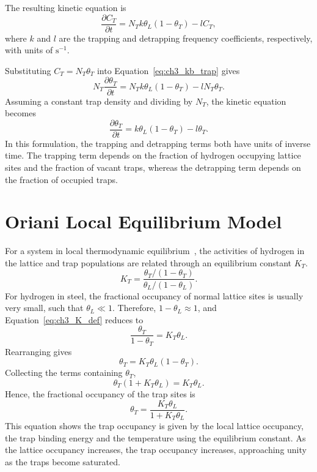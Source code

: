 \documentclass[a4paper,12pt,oneside]{report}
\begin{document}
The resulting kinetic equation is
\begin{equation}
\frac{\partial C_T}{\partial t} = N_T k\theta_L(1-\theta_T)-lC_T,
\label{eq:ch3_kb_trap}
\end{equation}
where $k$ and $l$ are the trapping and detrapping frequency coefficients, respectively, with units of $\mathrm{s}^{-1}$.

Substituting $C_T=N_T\theta_T$ into Equation~\eqref{eq:ch3_kb_trap} gives
\begin{equation}
N_T\frac{\partial\theta_T}{\partial t} = N_Tk\theta_L(1-\theta_T)-lN_T\theta_T.
\label{eq:ch3_kb_sub}
\end{equation}
Assuming a constant trap density and dividing by $N_T$, the kinetic equation becomes
\begin{equation}
\frac{\partial\theta_T}{\partial t} = k\theta_L(1-\theta_T)-l\theta_T.
\label{eq:ch3_kb_theta}
\end{equation}
In this formulation, the trapping and detrapping terms both have units of inverse time. The trapping term depends on the fraction of hydrogen occupying lattice sites and the fraction of vacant traps, whereas the detrapping term depends on the fraction of occupied traps.

\section{Oriani Local Equilibrium Model}

For a system in local thermodynamic equilibrium~\cite{Oriani1970}, the activities of hydrogen in the lattice and trap populations are related through an equilibrium constant $K_T$.
\begin{equation}
K_T = \frac{\theta_T/(1-\theta_T)}{\theta_L/(1-\theta_L)}.
\label{eq:ch3_K_def}
\end{equation}
For hydrogen in steel, the fractional occupancy of normal lattice sites is usually very small, such that $\theta_L\ll1$. Therefore, $1-\theta_L\approx1$, and Equation~\eqref{eq:ch3_K_def} reduces to
\begin{equation}
\frac{\theta_T}{1-\theta_T} = K_T\theta_L.
\label{eq:ch3_K_dilute}
\end{equation}
Rearranging gives
\begin{equation}
\theta_T = K_T\theta_L(1-\theta_T).
\label{eq:ch3_th_rearr}
\end{equation}
Collecting the terms containing $\theta_T$,
\begin{equation}
\theta_T(1+K_T\theta_L) = K_T\theta_L.
\label{eq:ch3_th_collect}
\end{equation}
Hence, the fractional occupancy of the trap sites is
\begin{equation}
\boxed{
\theta_T = \frac{K_T\theta_L}{1+K_T\theta_L}
}.
\label{eq:ch3_oriani}
\end{equation}
This equation shows the trap occupancy is given by the local lattice occupancy, the trap binding energy and the temperature using the equilibrium constant. As the lattice occupancy increases, the trap occupancy increases, approaching unity as the traps become saturated.
\end{document}
